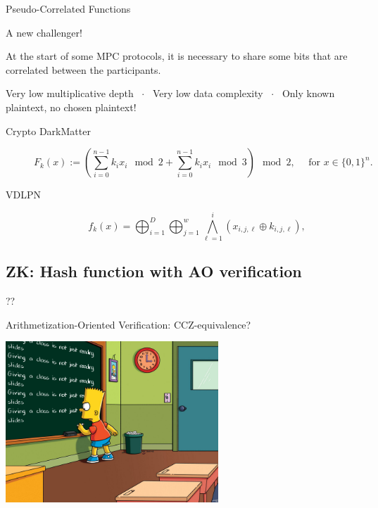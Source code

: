 \documentclass[presentation,aspectratio=1610]{beamer}
\begin{document}
\begin{frame}{Pseudo-Correlated Functions}

  \begin{exampleblock}{A new challenger!}
    {\small 
      At the start of some MPC protocols, it is necessary to share some
      bits that are correlated between the participants.

      \begin{center}
        Very low multiplicative depth ~$\cdot$~ \pause
        Very low data complexity ~$\cdot$~ \pause
        \alert{Only known plaintext, no chosen plaintext!}
      \end{center}
    }
  \end{exampleblock}

  \pause
  
  \begin{description}
  \item [Crypto DarkMatter] \cite{TCC:BIPSW18}
    \begin{equation*}
      F_k(x) := \left(\sum_{i = 0}^{n-1} k_i x_i \mod 2 + \sum_{i = 0}^{n-1} k_i x_i \mod 3\right) \mod{2}, \quad \text{ for } x \in \{0,1\}^n.  
    \end{equation*}

    \pause
  \item [VDLPN] \cite{add:BCGI+20}
    \begin{equation*}
      f_k(x) = \bigoplus_{i=1}^D \bigoplus_{j=1}^w\bigwedge_{\ell=1}^i (x_{i,j,\ell} \oplus k_{i,j,\ell}),
    \end{equation*}
  \end{description}
\end{frame}


\subsection{ZK: Hash function with AO verification}

\begin{frame}{??}

\end{frame}

\begin{frame}{Arithmetization-Oriented Verification: CCZ-equivalence?}
  \vfill

  \begin{center}
    \includegraphics[width=8cm]{./figures/simpsons}
  \end{center}
  
  \vfill
\end{frame}
\end{document}
